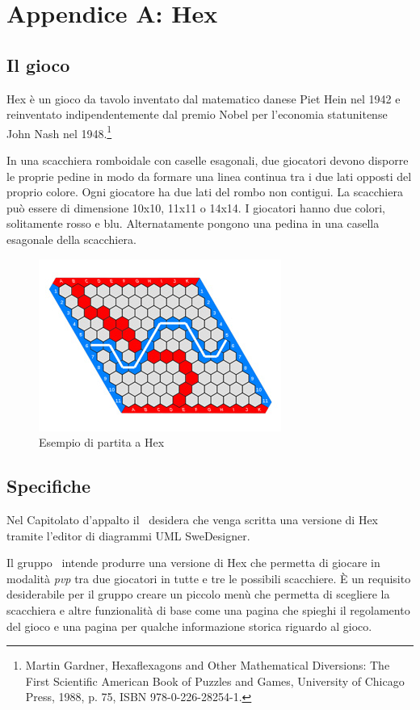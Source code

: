 \documentclass[../AnalisiDeiRequisiti.tex]{subfiles}
\begin{document}
	\section{Appendice A: Hex}

	\subsection{Il gioco}
			Hex è un gioco da tavolo inventato dal matematico danese Piet Hein nel 1942 e reinventato indipendentemente dal premio Nobel per l'economia statunitense John Nash nel 1948.\footnote[1]{Martin Gardner, Hexaflexagons and Other Mathematical Diversions: The First Scientific American Book of Puzzles and Games, University of Chicago Press, 1988, p. 75, ISBN 978-0-226-28254-1.}
			
			In una scacchiera romboidale con caselle esagonali, due giocatori devono disporre le proprie pedine in modo da formare una linea continua tra i due lati opposti del proprio colore. Ogni giocatore ha due lati del rombo non contigui.
			La scacchiera può essere di dimensione 10x10, 11x11 o 14x14.
			I giocatori hanno due colori, solitamente rosso e blu. Alternatamente pongono una pedina in una casella esagonale della scacchiera. 
		
		\begin{figure} [h!]
			\centering
			\includegraphics{./Figures/HexBoard.jpg}
			\caption{Esempio di partita a Hex}\label{fig:1}
		\end{figure}
	
	\subsection{Specifiche}
		Nel Capitolato d'appalto il \proponente\ desidera che venga scritta una versione di Hex tramite l'editor di diagrammi UML SweDesigner.
		
		Il gruppo \kaleidoscode\ intende produrre una versione di Hex che permetta di giocare in modalità \textit{pvp} tra due giocatori in tutte e tre le possibili scacchiere.
		È un requisito desiderabile per il gruppo creare un piccolo menù che permetta di scegliere la scacchiera e altre funzionalità di base come una pagina che spieghi il regolamento del gioco e una pagina per qualche informazione storica riguardo al gioco.
	
	
\end{document}
